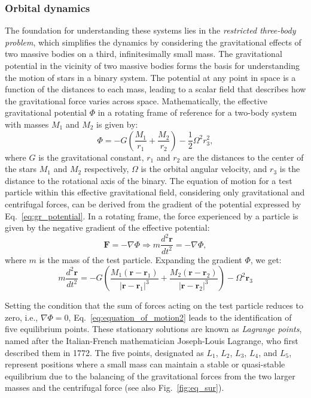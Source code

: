 \documentclass[main.tex]{subfiles}
\begin{document}
    \subsubsection{Orbital dynamics}
    The foundation for understanding these systems lies in the \textit{restricted three-body problem}, which simplifies the dynamics by considering the gravitational effects of two massive bodies on a third, infinitesimally small mass. The gravitational potential in the vicinity of two massive bodies forms the basis for understanding the motion of stars in a binary system. The potential at any point in space is a function of the distances to each mass, leading to a scalar field that describes how the gravitational force varies across space. Mathematically, the effective gravitational potential $\Phi$ in a rotating frame of reference for a two-body system with masses $M_1$ and $M_2$ is given by:
    \begin{equation}\label{eq:gr_potential}
        \Phi = -G \left(\frac{M_1}{r_1} + \frac{M_2}{r_2} \right) - \frac{1}{2}\Omega^2 r_3^2,
    \end{equation}
    where $G$ is the gravitational constant, $r_1$ and $r_2$ are the distances to the center of the stars $M_1$ and $M_2$ respectively, $\Omega$ is the orbital angular velocity, and $r_3$ is the distance to the rotational axis of the binary. The equation of motion for a test particle within this effective gravitational field, considering only gravitational and centrifugal forces, can be derived from the gradient of the potential expressed by Eq.~\eqref{eq:gr_potential}.  In a rotating frame, the force experienced by a particle is given by the negative gradient of the effective potential:
    \begin{equation}\label{eq:equation_of_motion1}
        \pmb{F} = -\nabla \Phi \Rightarrow m\frac{d^2 \pmb{r}}{dt^2} = -\nabla \Phi,
    \end{equation}
    where $m$ is the mass of the test particle. Expanding the gradient $\Phi$, we get:
    \begin{equation}\label{eq:equation_of_motion2}
        m \frac{d^2 \pmb{r}}{dt^2} = -G \left( \frac{M_1 (\pmb{r} - \pmb{r}_1)}{|\pmb{r} - \pmb{r}_1|^3} + \frac{M_2 (\pmb{r} - \pmb{r}_2)}{|\pmb{r} - \pmb{r}_2|^3} \right) - \Omega^2 \pmb{r}_3
    \end{equation}
    
    Setting the condition that the sum of forces acting on the test particle reduces to zero, i.e., $\nabla \Phi = 0$, Eq.~\eqref{eq:equation_of_motion2} leads to the identification of five equilibrium points. These stationary solutions are known as \textit{Lagrange points}, named after the Italian-French mathematician Joseph-Louis Lagrange, who first described them in 1772. The five points, designated as $L_1$, $L_2$, $L_3$, $L_4$, and $L_5$, represent positions where a small mass can maintain a stable or quasi-stable equilibrium due to the balancing of the gravitational forces from the two larger masses and the centrifugal force (see also Fig.~\ref{fig:eq_sur}). 
\end{document}
